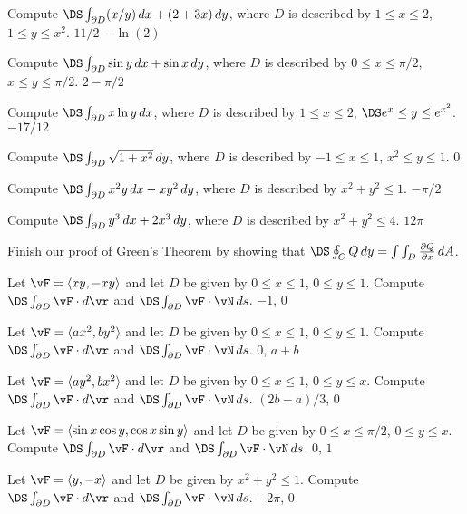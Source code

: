 \begin{multicols}{2}
\problem Compute $\DS\int_{\partial D} (x/y)\,dx + (2+3x)\,dy$,  %
where $D$ is described by $1\le x\le 2$, $1\le y\le x^2$.
\answer
$11/2-\ln(2)$
\endanswer

\problem Compute $\DS\int_{\partial D} \sin y\,dx + \sin x\,dy$,  %
where $D$ is described by $0\le x\le \pi/2$, $x\le y\le \pi/2$.
\answer
$2-\pi/2$
\endanswer

\problem Compute $\DS\int_{\partial D} x\ln y\,dx$, %
where $D$ is described by $1\le x\le 2$, $\DS e^x\le y\le e^{x^2}$.
\answer
$-17/12$
\endanswer

\problem Compute $\DS\int_{\partial D} \sqrt{1+x^2}\,dy$,  %
where $D$ is described by $-1\le x\le 1$, $x^2\le y\le 1$.
\answer
$0$
\endanswer

\problem Compute $\DS\int_{\partial D} x^2y\,dx - xy^2\,dy$,  %
where $D$ is described by $x^2+y^2\le 1$.
\answer
$-\pi/2$
\endanswer

\problem Compute $\DS\int_{\partial D} y^3\,dx + 2x^3\,dy$,  %
where $D$ is described by $x^2+y^2\le 4$.
\answer
$12\pi$
\endanswer

\problem Finish our proof of Green's Theorem by showing that %
$\DS\oint_C Q\,dy=\dint{D} {\partial Q\over\partial x}\,dA$.






\problem Let $\vF =\langle xy,-xy\rangle$ and  %
let $D$ be given by $0\le x\le 1$, $0\le y\le 1$.
Compute $\DS\int_{\partial D} \vF \cdot d\vr $ and
$\DS\int_{\partial D} \vF \cdot\vN \,ds$.
\answer
$-1$, $0$
\endanswer

\problem Let $\vF =\langle ax^2,by^2\rangle$ and  %
let $D$ be given by $0\le x\le 1$, $0\le y\le 1$.
Compute $\DS\int_{\partial D} \vF \cdot d\vr $ and
$\DS\int_{\partial D} \vF \cdot\vN \,ds$.
\answer
$0$, $a+b$
\endanswer

\problem Let $\vF =\langle ay^2,bx^2\rangle$ and  %
let $D$ be given by $0\le x\le 1$, $0\le y\le x$.
Compute $\DS\int_{\partial D} \vF \cdot d\vr $ and
$\DS\int_{\partial D} \vF \cdot\vN \,ds$.
\answer
$(2b-a)/3$, $0$
\endanswer

\problem Let $\vF =\langle \sin x\cos y,\cos x\sin y\rangle$ and  %
let $D$ be given by $0\le x\le \pi/2$, $0\le y\le x$.
Compute $\DS\int_{\partial D} \vF \cdot d\vr $ and
$\DS\int_{\partial D} \vF \cdot\vN \,ds$.
\answer
$0$, $1$
\endanswer

\problem Let $\vF =\langle y,-x\rangle$ and  %
let $D$ be given by $x^2+y^2\le 1$.
Compute $\DS\int_{\partial D} \vF \cdot d\vr $ and
$\DS\int_{\partial D} \vF \cdot\vN \,ds$.
\answer
$-2\pi$, $0$
\endanswer


\end{multicols}
